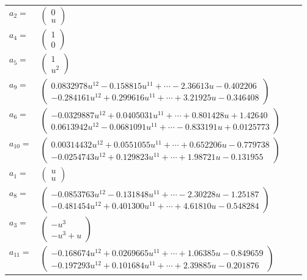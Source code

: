 \documentclass[1p]{elsarticle_modified}
\theoremstyle{definition}
\begin{document}
\begin{tabular}{m{7pt} m{180pt} m{7pt} m{180pt} }
\flushright $a_{2}=$&$\begin{pmatrix}0\\u\end{pmatrix}$ \\
\flushright $a_{4}=$&$\begin{pmatrix}1\\0\end{pmatrix}$ \\
\flushright $a_{5}=$&$\begin{pmatrix}1\\u^2\end{pmatrix}$ \\
\flushright $a_{9}=$&$\begin{pmatrix}0.0832978 u^{12}-0.158815 u^{11}+\cdots-2.36613 u-0.402206\\-0.284161 u^{12}+0.299616 u^{11}+\cdots+3.21925 u-0.346408\end{pmatrix}$ \\
\flushright $a_{6}=$&$\begin{pmatrix}-0.0329887 u^{12}+0.0405031 u^{11}+\cdots+0.801428 u+1.42640\\0.0613942 u^{12}-0.0681091 u^{11}+\cdots-0.833191 u+0.0125773\end{pmatrix}$ \\
\flushright $a_{10}=$&$\begin{pmatrix}0.00314432 u^{12}+0.0551055 u^{11}+\cdots+0.652206 u-0.779738\\-0.0254743 u^{12}+0.129823 u^{11}+\cdots+1.98721 u-0.131955\end{pmatrix}$ \\
\flushright $a_{1}=$&$\begin{pmatrix}u\\u\end{pmatrix}$ \\
\flushright $a_{8}=$&$\begin{pmatrix}-0.0853763 u^{12}-0.131848 u^{11}+\cdots-2.30228 u-1.25187\\-0.481454 u^{12}+0.401300 u^{11}+\cdots+4.61810 u-0.548284\end{pmatrix}$ \\
\flushright $a_{3}=$&$\begin{pmatrix}- u^3\\- u^3+u\end{pmatrix}$ \\
\flushright $a_{11}=$&$\begin{pmatrix}-0.168674 u^{12}+0.0269665 u^{11}+\cdots+1.06385 u-0.849659\\-0.197293 u^{12}+0.101684 u^{11}+\cdots+2.39885 u-0.201876\end{pmatrix}$ \\

\end{tabular}
\end{document}
